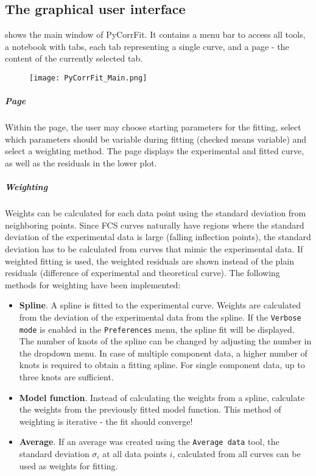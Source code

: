 \subsection{The graphical user interface}
\label{cha_graphint}
\label{sec:PyCorrFitUserInterface}
 shows the main window of PyCorrFit. It contains a menu bar to access all tools, a notebook with tabs, each tab representing a single curve, and a page - the content of the currently selected tab. 
\begin{figure}[h]
\centering
\texttt{[image: PyCorrFit\_Main.png]}
\end{figure}
\subparagraph*{Page}
Within the page, the user may choose starting parameters for the fitting, select which parameters should be variable during fitting (checked means variable) and select a weighting method. The page displays the experimental and fitted curve, as well as the residuals in the lower plot.

\subparagraph*{Weighting}
Weights can be calculated for each data point using the standard deviation from neighboring points. Since FCS curves naturally have regions where the standard deviation of the experimental data is large (falling inflection points), the standard deviation has to be calculated from curves that mimic the experimental data. If weighted fitting is used, the weighted residuals are shown instead of the plain residuals (difference of experimental and theoretical curve). The following methods for weighting have been implemented:
\begin{itemize}
\item[] \textbf{Spline}. A spline is fitted to the experimental curve. Weights are calculated from the deviation of the experimental data from the spline. If  the \texttt{Verbose mode} is enabled in  the \texttt{Preferences} menu, the spline fit will be displayed. The number of knots of the spline can be changed by adjusting the number in the dropdown menu. In case of multiple component data, a higher number of knots is required to obtain a fitting spline. For single component data, up to three knots are sufficient.
\item[] \textbf{Model function}. Instead of calculating the weights from a spline, calculate the weights from the previously fitted model function. This method of weighting is iterative - the fit should converge!
\item[] \textbf{Average}. If an average was created using the \texttt{Average data} tool, the standard deviation $\sigma_i$ at all data points $i$, calculated from all curves can be used as weights for fitting. 
\end{itemize}

